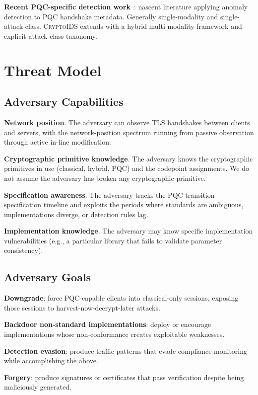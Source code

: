 \documentclass[sigconf,nonacm]{acmart}
\begin{document}
\textbf{Recent PQC-specific detection work}~\cite{harkins2024pqcmonitor,
yoo2025pqcanomaly}: nascent literature applying anomaly detection
to PQC handshake metadata. Generally single-modality and
single-attack-class. \textsc{CryptoIDS} extends with a hybrid
multi-modality framework and explicit attack-class taxonomy.

\section{Threat Model}

\subsection{Adversary Capabilities}

\textbf{Network position}. The adversary can observe TLS handshakes
between clients and servers, with the network-position spectrum
running from passive observation through active in-line modification.

\textbf{Cryptographic primitive knowledge}. The adversary knows
the cryptographic primitives in use (classical, hybrid, PQC) and
the codepoint assignments. We do not assume the adversary has
broken any cryptographic primitive.

\textbf{Specification awareness}. The adversary tracks the
PQC-transition specification timeline and exploits the periods
where standards are ambiguous, implementations diverge, or
detection rules lag.

\textbf{Implementation knowledge}. The adversary may know specific
implementation vulnerabilities (e.g., a particular library that
fails to validate parameter consistency).

\subsection{Adversary Goals}

\textbf{Downgrade}: force PQC-capable clients into
classical-only sessions, exposing those sessions to harvest-now-decrypt-later
attacks.

\textbf{Backdoor non-standard implementations}: deploy or
encourage implementations whose non-conformance creates exploitable
weaknesses.

\textbf{Detection evasion}: produce traffic patterns that evade
compliance monitoring while accomplishing the above.

\textbf{Forgery}: produce signatures or certificates that pass
verification despite being maliciously generated.
\end{document}
